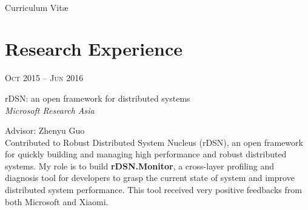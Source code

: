 \documentclass[10pt]{article} %
\begin{document}
\color{text1} %


\par{\\ %
{\color{headings} Curriculum {Vit\ae}\\[15pt]\par} %
	

\begin{minipage}[t]{0.5\textwidth} %
\vspace{0pt} %
	

\section{Research Experience} 


{\raggedleft\textsc{Oct 2015 -- Jun 2016}\par}

{\raggedright\large rDSN:  an open framework for distributed systems\\
\textit{{\color{stress}Microsoft Research} Asia }\\[5pt]
}

Advisor: Zhenyu Guo\\
\normalsize{Contributed to Robust Distributed System Nucleus (rDSN), an open framework for quickly building and managing high performance and robust distributed systems.  My role is to build \textbf{rDSN.Monitor}, a cross-layer profiling and diagnosis tool for developers to grasp the current state of system and improve distributed system performance. This tool  received very positive feedbacks from both Microsoft and Xiaomi.}\\




\end{minipage}}
\end{document}

